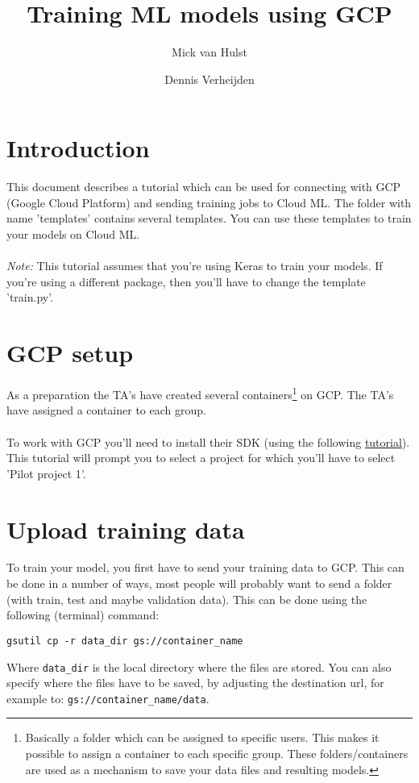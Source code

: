 \documentclass{article}
\title{Training ML models using GCP}
\author{Mick van Hulst \and Dennis Verheijden}
\begin{document}
\maketitle

\section{Introduction}
This document describes a tutorial which can be used for connecting with GCP (Google Cloud Platform) and sending training jobs to Cloud ML. The folder with name 'templates' contains several templates. You can use these templates to train your models on Cloud ML. 
\\
\\
\textit{Note: }This tutorial assumes that you're using Keras to train your models. If you're using a different package, then you'll have to change the template 'train.py'.

\section{GCP setup}
As a preparation the TA's have created several containers\footnote{Basically a folder which can be assigned to specific users. This makes it possible to assign a container to each specific group. These folders/containers are used as a mechanism to save your data files and resulting models.} on GCP. The TA's have assigned a container to each group.
\\
\\
To work with GCP you'll need to install their SDK (using the following \hyperlink{https://cloud.google.com/sdk/docs/}{tutorial}). This tutorial will prompt you to select a project for which you'll have to select 'Pilot project 1'.

\section{Upload training data}
To train your model, you first have to send your training data to GCP. This can be done in a number of ways, most people will probably want to send a folder (with train, test and maybe validation data). This can be done using the following (terminal) command:

\begin{verbatim}
gsutil cp -r data_dir gs://container_name
\end{verbatim}

Where \texttt{data\_dir} is the local directory where the files are stored. You can also specify where the files have to be saved, by adjusting the destination url, for example to: \texttt{gs://container\_name/data}.
\end{document}
